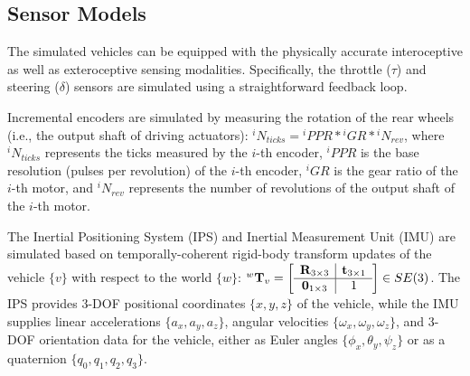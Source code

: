 \documentclass[letterpaper, 10 pt, conference]{ieeeconf}  %
\begin{document}
	\subsection{Sensor Models}
	\label{Sub-Section: Sensor Models}
	
	The simulated vehicles can be equipped with the physically accurate interoceptive as well as exteroceptive sensing modalities. Specifically, the throttle ($\tau$) and steering ($\delta$) sensors are simulated using a straightforward feedback loop.
	
	Incremental encoders are simulated by measuring the rotation of the rear wheels (i.e., the output shaft of driving actuators): $^iN_{ticks} = {^iPPR} * {^iGR} * {^iN_{rev}}$, where $^iN_{ticks}$ represents the ticks measured by the $i$-th encoder, $^iPPR$ is the base resolution (pulses per revolution) of the $i$-th encoder, $^iGR$ is the gear ratio of the $i$-th motor, and $^iN_{rev}$ represents the number of revolutions of the output shaft of the $i$-th motor.
	
	The Inertial Positioning System (IPS) and Inertial Measurement Unit (IMU) are simulated based on temporally-coherent rigid-body transform updates of the vehicle $\{v\}$ with respect to the world $\{w\}$: ${^w\mathbf{T}_v} = \left[\begin{array}{c | c} \mathbf{R}_{3 \times 3} & \mathbf{t}_{3 \times 1} \\ \hline \mathbf{0}_{1 \times 3} & 1 \end{array}\right] \in SE(3)$. The IPS provides 3-DOF positional coordinates $\{x,y,z\}$ of the vehicle, while the IMU supplies linear accelerations $\{a_x,a_y,a_z\}$, angular velocities $\{\omega_x,\omega_y,\omega_z\}$, and 3-DOF orientation data for the vehicle, either as Euler angles $\{\phi_x,\theta_y,\psi_z\}$ or as a quaternion $\{q_0,q_1,q_2,q_3\}$.
	
\end{document}
